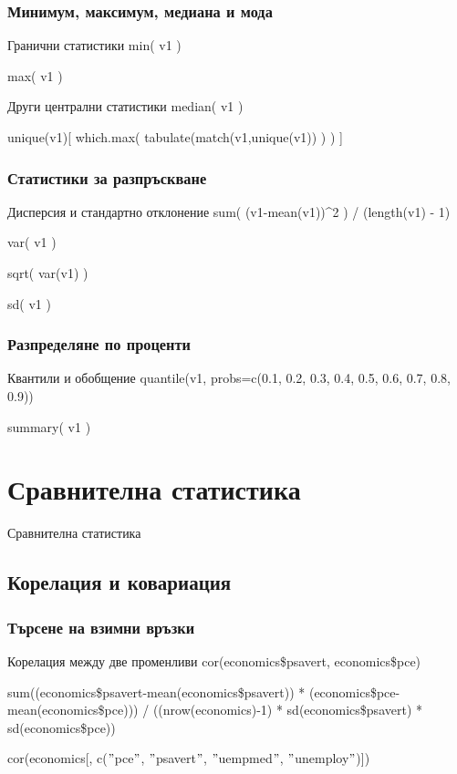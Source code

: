 \documentclass{beamer}
\begin{document}
\begin{frame}
\frametitle{Минимум, максимум, медиана и мода}
\begin{block}{Гранични статистики}
min( v1 )

max( v1 )
\end{block}

\begin{block}{Други централни статистики}
median( v1 )

unique(v1)[ which.max( tabulate(match(v1,unique(v1)) ) ) ]
\end{block}
\end{frame}

\begin{frame}
\frametitle{Статистики за разпръскване}
\begin{block}{Дисперсия и стандартно отклонение}
sum( (v1-mean(v1))\textasciicircum 2 ) / (length(v1) - 1)

var( v1 )

sqrt( var(v1) )

sd( v1 )
\end{block}
\end{frame}

\begin{frame}
\frametitle{Разпределяне по проценти}
\begin{block}{Квантили и обобщение}
quantile(v1, probs=c(0.1, 0.2, 0.3, 0.4, 0.5, 0.6, 0.7, 0.8, 0.9))

summary( v1 )
\end{block}
\end{frame}

\section{Сравнителна статистика}

\begin{frame}
\center \huge{Сравнителна статистика}
\end{frame}

\subsection{Корелация и ковариация}

\begin{frame}
\frametitle{Търсене на взимни връзки}
\begin{block}{Корелация между две променливи}
cor(economics\$psavert, economics\$pce)

sum((economics\$psavert-mean(economics\$psavert)) * (economics\$pce-mean(economics\$pce))) / ((nrow(economics)-1) * sd(economics\$psavert) * sd(economics\$pce))

cor(economics[, c($"$pce$"$, $"$psavert$"$, $"$uempmed$"$, $"$unemploy$"$)])
\end{block}
\end{frame}
\end{document}
